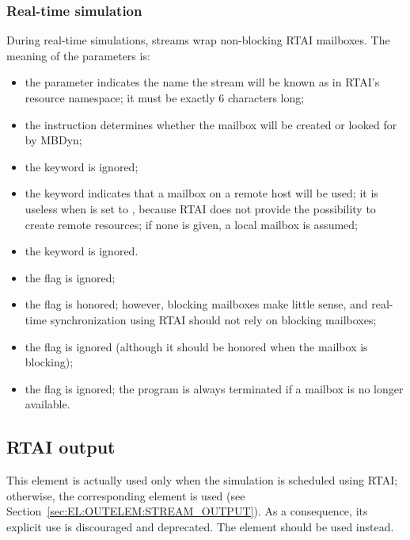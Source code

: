 \subsubsection{Real-time simulation}
During real-time simulations, streams wrap non-blocking RTAI mailboxes.
The meaning of the parameters is:
\begin{itemize}
\item the parameter  indicates the name the stream
will be known as in RTAI's resource namespace; it must be exactly 6 characters long;

\item the instruction  determines whether the mailbox will be
created or looked for by MBDyn;

\item the keyword  is ignored;

\item the keyword  indicates that a mailbox on a remote host 
will be used; it is useless when  is set to , because
RTAI does not provide the possibility to create remote resources;
if none is given, a local mailbox is assumed;

\item the keyword  is ignored.

\item the flag  is ignored;

\item the flag  is honored; however, blocking mailboxes
make little sense, and real-time synchronization using RTAI should not rely
on blocking mailboxes;

\item the flag  is ignored (although it should be honored
when the mailbox is blocking);

\item the flag  is ignored;
the program is always terminated if a mailbox is no longer available.
\end{itemize}





\subsection{RTAI output}\label{sec:EL:OUTELEM:RTAI_out}
This element is actually used only when the simulation is scheduled
using RTAI; otherwise, the corresponding  element
is used (see Section~\ref{sec:EL:OUTELEM:STREAM_OUTPUT}).
As a consequence, its explicit use is discouraged and deprecated.
The  element should be used instead.




